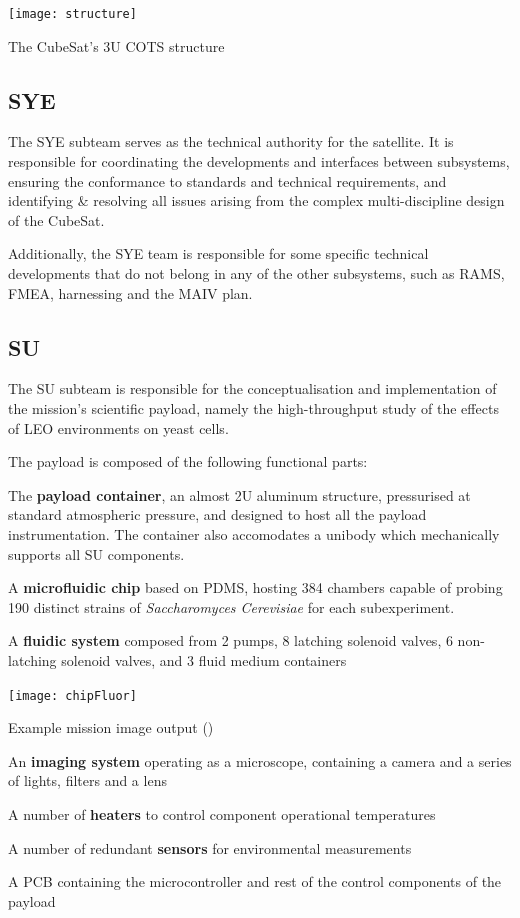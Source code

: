 \documentclass[a4paper,nobib]{tufte-book}
\begin{document}
\begin{marginfigure}
	\centering
	\texttt{[image: structure]}
	\caption{The CubeSat's 3U \acs{COTS} structure}
	\label{fig:structure}
\end{marginfigure}

\subsection{\acf{SYE}}

The \acl{SYE} subteam serves as the technical authority for the satellite. It is responsible for coordinating the developments and interfaces between subsystems, ensuring the conformance to standards and technical requirements, and identifying \& resolving all issues arising from the complex multi-discipline design of the CubeSat.

Additionally, the \ac{SYE} team is responsible for some specific technical developments that do not belong in any of the other subsystems, such as \ac{RAMS}, \ac{FMEA}, harnessing and the \acl{MAIV} plan.

\subsection{\acf{SU}}

The \acl{SU} subteam is responsible for the conceptualisation and implementation of the mission's scientific payload, namely the high-throughput study of the effects of \ac{LEO} environments on yeast cells.

The payload is composed of the following functional parts:\autocite{DDJF_PL}
\begin{compactitem}
	\item The \textbf{payload container}, an almost 2U aluminum structure, pressurised at standard atmospheric pressure, and designed to host all the payload instrumentation. The container also accomodates a unibody which mechanically supports all \ac{SU} components.
	\item A \textbf{microfluidic chip} based on \ac{PDMS}, hosting 384 chambers capable of probing 190 distinct strains of \emph{Saccharomyces Cerevisiae} for each subexperiment.
	\item A \textbf{fluidic system} composed from 2 pumps, 8 latching solenoid valves, 6 non-latching solenoid valves, and 3 fluid medium containers
	\begin{marginfigure}
		\texttt{[image: chipFluor]}
		\caption[Example mission image output]{Example mission image output (\parencite{DDJF_PL})}
		\label{fig:chip_fluor}
	\end{marginfigure}
	\item An \textbf{imaging system} operating as a microscope, containing a camera and a series of lights, filters and a lens
	\item A number of \textbf{heaters} to control component operational temperatures
	\item A number of redundant \textbf{sensors} for environmental measurements
	\item A \ac{PCB} containing the microcontroller and rest of the control components of the payload
\end{compactitem}
\end{document}

